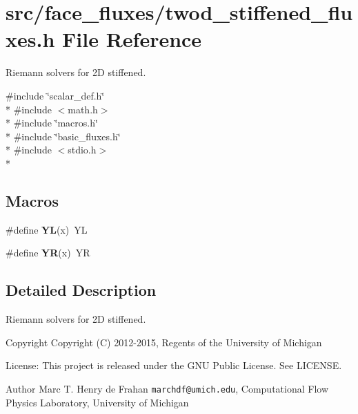 \section{src/face\-\_\-fluxes/twod\-\_\-stiffened\-\_\-fluxes.h File Reference}
\label{twod__stiffened__fluxes_8h}


Riemann solvers for 2\-D stiffened.  


{\ttfamily \#include \char`\"{}scalar\-\_\-def.\-h\char`\"{}}\\*
{\ttfamily \#include $<$math.\-h$>$}\\*
{\ttfamily \#include \char`\"{}macros.\-h\char`\"{}}\\*
{\ttfamily \#include \char`\"{}basic\-\_\-fluxes.\-h\char`\"{}}\\*
{\ttfamily \#include $<$stdio.\-h$>$}\\*
\subsection*{Macros}
\begin{DoxyCompactItemize}
\item 
\#define {\bfseries Y\-L}(x)~Y\-L\label{twod__stiffened__fluxes_8h_a77cb2523048b3756423bcc1051e4f30c}

\item 
\#define {\bfseries Y\-R}(x)~Y\-R\label{twod__stiffened__fluxes_8h_ac574c67246847dfb54604debb74f7e95}

\end{DoxyCompactItemize}


\subsection{Detailed Description}
Riemann solvers for 2\-D stiffened. \begin{DoxyCopyright}{Copyright}
Copyright (C) 2012-\/2015, Regents of the University of Michigan 
\end{DoxyCopyright}
\begin{DoxyParagraph}{License\-:}
This project is released under the G\-N\-U Public License. See L\-I\-C\-E\-N\-S\-E. 
\end{DoxyParagraph}
\begin{DoxyAuthor}{Author}
Marc T. Henry de Frahan {\tt marchdf@umich.\-edu}, Computational Flow Physics Laboratory, University of Michigan 
\end{DoxyAuthor}

